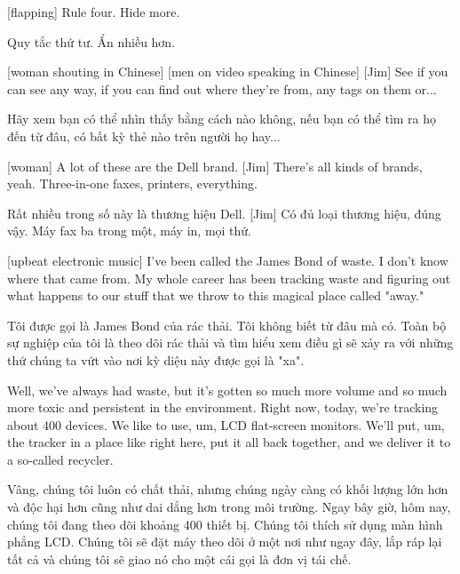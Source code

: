 \documentclass[a4paper]{article}
\begin{document}
	[flapping]
	Rule four. Hide more.
	
	\begin{vietnamese-v2}
		[vỗ tay]
		Quy tắc thứ tư. Ẩn nhiều hơn.
	\end{vietnamese-v2}
	
	[woman shouting in Chinese]
	[men on video speaking in Chinese]
	[Jim] See if you can see any way, if you can find out where they're from, any tags on them or...
	
	\begin{vietnamese-v2}
		 Hãy xem bạn có thể nhìn thấy bằng cách nào không, nếu bạn có thể tìm ra họ đến từ đâu, có bất kỳ thẻ nào trên người họ hay...
	\end{vietnamese-v2}
	
	[woman] A lot of these are the Dell brand.
	[Jim] There's all kinds of brands, yeah.
	Three-in-one faxes, printers, everything.
	
	\begin{vietnamese-v2}
		[phụ nữ] Rất nhiều trong số này là thương hiệu Dell.
		[Jim] Có đủ loại thương hiệu, đúng vậy.
		Máy fax ba trong một, máy in, mọi thứ.
	\end{vietnamese-v2}
	
	[upbeat electronic music]
	I've been called the James Bond of waste.
	I don't know where that came from.
	My whole career has been tracking waste and figuring out what happens to our stuff that we throw to this magical place called "away."
	
	\begin{vietnamese-v2}
		Tôi được gọi là James Bond của rác thải.
		Tôi không biết từ đâu mà có.
		Toàn bộ sự nghiệp của tôi là theo dõi rác thải và tìm hiểu xem điều gì sẽ xảy ra với những thứ chúng ta vứt vào nơi kỳ diệu này được gọi là "xa".
	\end{vietnamese-v2}
	
	Well, we've always had waste, but it's gotten so much more volume and so much more toxic and persistent in the environment.
	Right now, today, we're tracking about 400 devices.
	We like to use, um, LCD flat-screen monitors.
	We'll put, um, the tracker in a place like right here, put it all back together, and we deliver it to a so-called recycler.
	
	\begin{vietnamese-v2}
		Vâng, chúng tôi luôn có chất thải, nhưng chúng ngày càng có khối lượng lớn hơn và độc hại hơn cũng như dai dẳng hơn trong môi trường.
		Ngay bây giờ, hôm nay, chúng tôi đang theo dõi khoảng 400 thiết bị.
		Chúng tôi thích sử dụng màn hình phẳng LCD.
		Chúng tôi sẽ đặt máy theo dõi ở một nơi như ngay đây, lắp ráp lại tất cả và chúng tôi sẽ giao nó cho một cái gọi là đơn vị tái chế.
	\end{vietnamese-v2}
	
\end{document}
